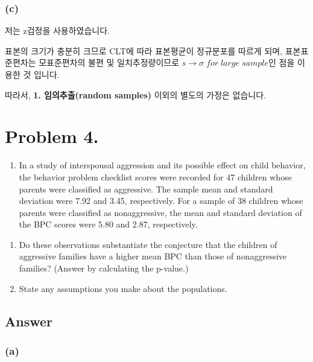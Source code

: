 \documentclass[
  a4paper,
  DIV=11,
  numbers=noendperiod]{scrreprt}
\providecommand{\tightlist}{%
  \setlength{\itemsep}{0pt}\setlength{\parskip}{0pt}}\usepackage{longtable,booktabs,array}
\begin{document}
\subsubsection*{(c)}\label{c-1}

저는 z검정을 사용하였습니다.

표본의 크기가 충분히 크므로 CLT에 따라 표본평균이 정규분포를 따르게
되며, 표본표준편차는 모표준편차의 불편 및 일치추정량이므로
\(s\rightarrow\sigma\;for\;large\;sample\)인 점을 이용한 것 입니다.

따라서, \textbf{1. 임의추출(random samples)} 이외의 별도의 가정은
없습니다.

\section*{Problem 4.}\label{problem-4.}


\begin{enumerate}
\def\labelenumi{\arabic{enumi}.}
\setcounter{enumi}{3}
\tightlist
\item
  In a study of interspousal aggression and its possible effect on child
  behavior, the behavior problem checklist scores were recorded for 47
  children whose parents were classified as aggressive. The sample mean
  and standard deviation were 7.92 and 3.45, respectively. For a sample
  of 38 children whose parents were classified as nonaggressive, the
  mean and standard deviation of the BPC scores were 5.80 and 2.87,
  respectively.
\end{enumerate}

\begin{enumerate}
\def\labelenumi{(\alph{enumi})}
\item
  Do these observations substantiate the conjecture that the children of
  aggressive families have a higher mean BPC than those of nonaggressive
  families? (Answer by calculating the p-value.)
\item
  State any assumptions you make about the populations.
\end{enumerate}

\subsection*{Answer}\label{answer-29}

\subsubsection*{(a)}\label{a-3}
\end{document}

